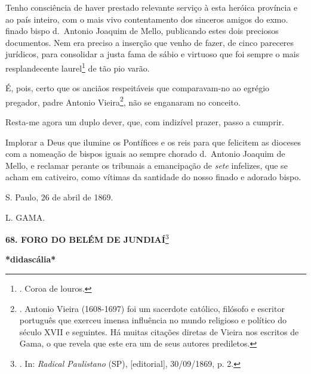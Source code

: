 Tenho consciência de haver prestado relevante serviço à esta heróica
província e ao país inteiro, com o mais vivo contentamento dos sinceros
amigos do exmo. finado bispo d.~Antonio Joaquim de Mello, publicando
estes dois preciosos documentos. Nem era preciso a inserção que venho de
fazer, de cinco pareceres jurídicos, para consolidar a justa fama de
sábio e virtuoso que foi sempre o mais resplandecente laurel\footnote{.
  Coroa de louros.} de tão pio varão.

É, pois, certo que os anciãos respeitáveis que comparavam-no ao egrégio
pregador, padre Antonio Vieira\footnote{. Antonio Vieira (1608-1697) foi
  um sacerdote católico, filósofo e escritor português que exerceu
  imensa influência no mundo religioso e político do século XVII e
  seguintes. Há muitas citações diretas de Vieira nos escritos de Gama,
  o que revela que este era um de seus autores prediletos.}, não se
enganaram no conceito.

Resta-me agora um duplo dever, que, com indizível prazer, passo a
cumprir.

Implorar a Deus que ilumine os Pontífices e os reis para que felicitem
as dioceses com a nomeação de bispos iguais ao sempre chorado d.~Antonio
Joaquim de Mello, e reclamar perante os tribunais a emancipação de
\emph{sete} infelizes, que se acham em cativeiro, como vítimas da
santidade do nosso finado e adorado bispo.

S. Paulo, 26 de abril de 1869.

L. GAMA.

\textbf{68. FORO DO BELÉM DE JUNDIAÍ}\footnote{. In: \emph{Radical
  Paulistano} (SP), {[}editorial{]}, 30/09/1869, p. 2.}

\textbf{*didascália*}

